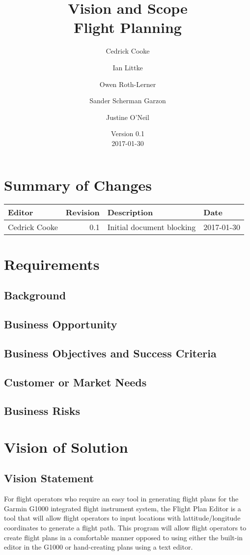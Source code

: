 \documentclass[12pt, letterpaper]{article}
\title{Vision and Scope \\
Flight Planning
}
\author{ Cedrick Cooke
    \and Ian Littke
    \and Owen Roth-Lerner
    \and Sander Scherman Garzon
    \and Justine O'Neil
}
\date{Version 0.1 \\ 2017-01-30}
\begin{document}
\maketitle

\tableofcontents

\section*{Summary of Changes}
\begin{tabularx}{\textwidth}{|l|r|X|l|}
\hline
Editor & Revision & Description & Date \\ \hline \hline
Cedrick Cooke & 0.1 & Initial document blocking & 2017-01-30 \\ \hline
\end{tabularx}

\section{Requirements}
\subsection{Background}
\subsection{Business Opportunity}
\subsection{Business Objectives and Success Criteria}
\subsection{Customer or Market Needs}
\subsection{Business Risks}

\section{Vision of Solution}
  \subsection{Vision Statement}
    For flight operators who require an easy tool in generating flight plans for
    the Garmin G1000 integrated flight instrument system, the Flight Plan Editor
    is a tool that will allow flight operators to input locations with
    lattitude/longitude coordinates to generate a flight path.
    This program will allow flight operators to create flight plans in a
    comfortable manner opposed to using either the built-in editor in the G1000
    or hand-creating plans using a text editor.
\end{document}
